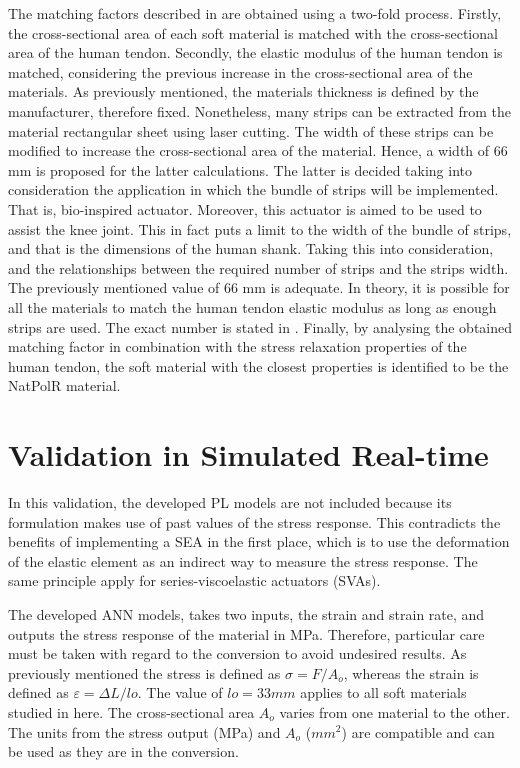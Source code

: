The matching factors described in  are obtained using a two-fold process. Firstly, the cross-sectional area of each soft material is matched with the cross-sectional area of the human tendon. Secondly, the elastic modulus of the human tendon is matched, considering the previous increase in the cross-sectional area of the materials. As previously mentioned, the materials thickness is defined by the manufacturer, therefore fixed. Nonetheless, many strips can be extracted from the material rectangular sheet using laser cutting. The width of these strips can be modified to increase the cross-sectional area of the material. Hence, a width of 66 mm is proposed for the latter calculations. The latter is decided taking into consideration the application in which the bundle of strips will be implemented. That is, bio-inspired actuator. Moreover, this actuator is aimed to be used to assist the knee joint. This in fact puts a limit to the width of the bundle of strips, and that is the dimensions of the human shank. Taking this into consideration, and the relationships between the required number of strips and the strips width. The previously mentioned value of 66 mm is adequate. In theory, it is possible for all the materials to match the human tendon elastic modulus as long as enough strips are used. The exact number is stated in . Finally, by analysing the obtained matching factor in combination with the stress relaxation properties of the human tendon, the soft material with the closest properties is identified to be the NatPolR material.

\section{Validation in Simulated Real-time}

In this validation, the developed PL models are not included because its formulation makes use of past values of the stress response. This contradicts the benefits of implementing a SEA in the first place, which is to use the deformation of the elastic element as an indirect way to measure the stress response. The same principle apply for series-viscoelastic actuators (SVAs). 

The developed ANN models, takes two inputs, the strain and strain rate, and outputs the stress response of the material in MPa. Therefore, particular care must be taken with regard to the conversion to avoid undesired results. As previously mentioned the stress is defined as $\sigma = F/A_o$, whereas the strain is defined as $\varepsilon = \Delta L / lo$. The value of $lo=33mm$ applies to all soft materials studied in here. The cross-sectional area $A_o$ varies from one material to the other. The units from the stress output (MPa) and $A_o$ ($mm^2$) are compatible and can be used as they are in the conversion. 

